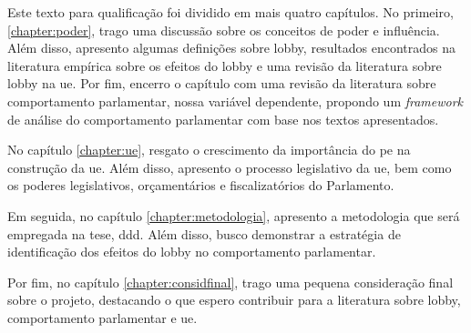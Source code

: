 Este texto para qualificação foi dividido em mais quatro capítulos. No primeiro, \ref{chapter:poder}, trago uma discussão sobre os conceitos de poder e influência. Além disso, apresento algumas definições sobre lobby, resultados encontrados na literatura empírica sobre os efeitos do lobby e uma revisão da literatura sobre lobby na \acrshort{ue}. Por fim, encerro o capítulo com uma revisão da literatura sobre comportamento parlamentar, nossa variável dependente, propondo um \textit{framework} de análise do comportamento parlamentar com base nos textos apresentados.

No capítulo \ref{chapter:ue}, resgato o crescimento da importância do \acrshort{pe} na construção da \acrshort{ue}. Além disso, apresento o processo legislativo da \acrshort{ue}, bem como os poderes legislativos, orçamentários e fiscalizatórios do Parlamento.

Em seguida, no capítulo \ref{chapter:metodologia}, apresento a metodologia que será empregada na tese, \acrfull{ddd}. Além disso, busco demonstrar a estratégia de identificação dos efeitos do lobby no comportamento parlamentar.

Por fim, no capítulo \ref{chapter:considfinal}, trago uma pequena consideração final sobre o projeto, destacando o que espero contribuir para a literatura sobre lobby, comportamento parlamentar e \acrshort{ue}.